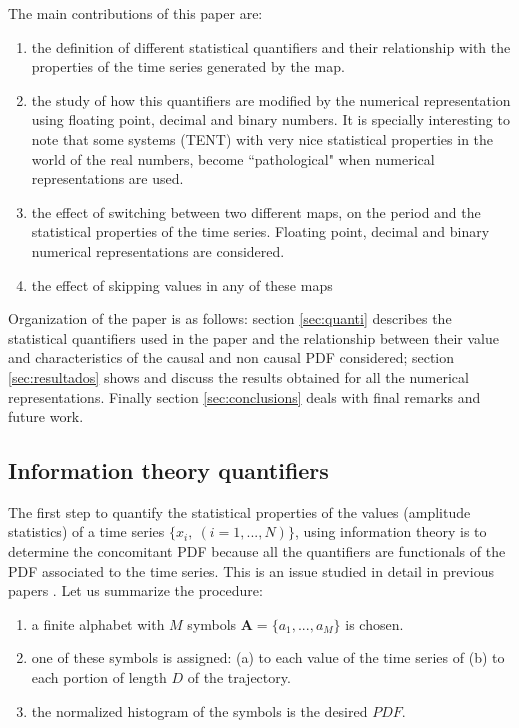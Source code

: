 The main contributions of this paper are:
\begin{enumerate}
\item the definition of different statistical quantifiers and their relationship  with the properties of the time series generated by the map. 
\item the study of how this quantifiers are modified by the numerical representation using floating point, decimal and binary numbers. It is specially interesting to note that some systems (TENT) with very nice statistical properties in the world of the real numbers, become ``pathological" when numerical representations are used.
\item the effect of switching between two different maps, on the period and the statistical properties of the time series. Floating point, decimal and binary numerical representations are considered. 
\item the effect of skipping values in any of these maps
\end{enumerate}

Organization of the paper is as follows: section \ref{sec:quanti} describes the statistical quantifiers used in the paper and the relationship between their value and characteristics of the causal and non causal PDF considered; section \ref{sec:resultados} shows and discuss the results obtained for all the numerical representations. Finally section  \ref{sec:conclusions} deals with final remarks and future work. 
%
\subsection{Information theory quantifiers}\label{sec:quant}
The first step to quantify the statistical properties of the values (amplitude statistics) of a time series $\{x_i,~(i=1,...,N)\}$, using information theory is to determine the concomitant PDF because all the quantifiers are functionals of the PDF associated to the time series. This is an issue studied in detail in previous papers \cite{aka varios}. Let us summarize the procedure:
\begin{enumerate} 
\item \label{1} a finite alphabet  with $M$ symbols $\mathbf{ A}=\{a_1,...,a_M\}$ is chosen. 
\item \label{2} one of these symbols is assigned: (a) to each value of the time series of (b) to each portion of length $D$ of the trajectory. 
\item \label{3} the normalized histogram of the symbols is the desired $PDF$.
\end{enumerate}

